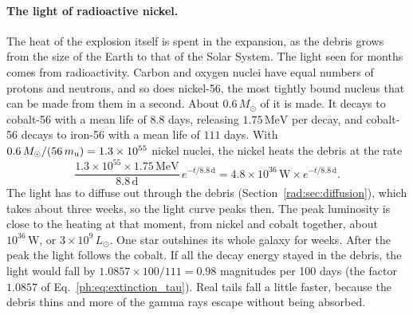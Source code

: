 \paragraph{The light of radioactive nickel.} The heat of the explosion itself is spent in the expansion, as the debris grows from the size of the Earth to that of the Solar System. The light seen for months comes from radioactivity. Carbon and oxygen nuclei have equal numbers of protons and neutrons, and so does nickel-56, the most tightly bound nucleus that can be made from them in a second. About $0.6\,M_\odot$ of it is made. It decays to cobalt-56 with a mean life of $8.8$ days, releasing $1.75\,\mathrm{MeV}$ per decay, and cobalt-56 decays to iron-56 with a mean life of $111$ days. With $0.6\,M_\odot/(56\,m_{\rm u})=1.3\times10^{55}$ nickel nuclei, the nickel heats the debris at the rate
\begin{equation}
	\frac{1.3\times10^{55}\times1.75\,\mathrm{MeV}}{8.8\,\mathrm d}\,e^{-t/8.8\,\mathrm d}
	=4.8\times10^{36}\,\mathrm W\times e^{-t/8.8\,\mathrm d}.
\end{equation}
The light has to diffuse out through the debris (Section~\ref{rad:sec:diffusion}), which takes about three weeks, so the light curve peaks then. The peak luminosity is close to the heating at that moment, from nickel and cobalt together, about $10^{36}\,\mathrm W$, or $3\times10^9\,L_\odot$. One star outshines its whole galaxy for weeks. After the peak the light follows the cobalt. If all the decay energy stayed in the debris, the light would fall by $1.0857\times100/111=0.98$ magnitudes per 100 days (the factor $1.0857$ of Eq.~\eqref{ph:eq:extinction_tau}). Real tails fall a little faster, because the debris thins and more of the gamma rays escape without being absorbed.

